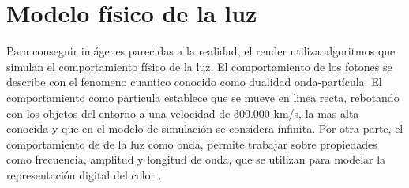 \section{Modelo f\'isico de la luz}
    Para conseguir im\'agenes parecidas a la realidad, el render utiliza algoritmos que simulan el comportamiento f\'isico de la luz.
    El comportamiento de los fotones se describe con el fenomeno cuantico conocido como dualidad onda-part\'icula. El comportamiento
    como particula establece que se mueve en linea recta, rebotando con los objetos del entorno a una velocidad de 300.000 km/s,
    la mas alta conocida y que en el modelo de simulaci\'on se considera infinita. Por otra parte, el comportamiento de de la luz como
    onda, permite trabajar sobre propiedades como frecuencia, amplitud y longitud de onda, que se utilizan para modelar la representaci\'on
    digital del color .

    
    

